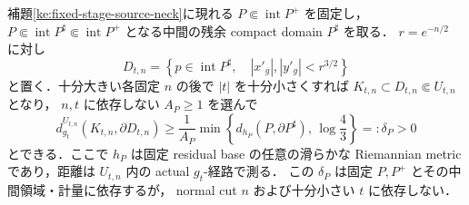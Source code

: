 \begin{lemma}
\label{ke:source-shell-first-exit-buffer}
補題\ref{ke:fixed-stage-source-neck}に現れる
\(P\Subset\operatorname{int}P^+\) を固定し，
\(P\Subset\operatorname{int}P^\sharp\Subset\operatorname{int}P^+\)
となる中間の残余 compact domain \(P^\sharp\) を取る．
\(r=e^{-n/2}\) に対し
\[
 D_{t,n}=
 \left\{p\in\operatorname{int}P^\sharp,\quad
 |x'_g|,|y'_g|<r^{3/2}\right\}
\]
と置く．十分大きい各固定 \(n\) の後で \(|t|\) を十分小さくすれば
\(K_{t,n}\subset D_{t,n}\Subset U_{t,n}\) となり，
\(n,t\) に依存しない \(A_P\ge1\) を選んで
\begin{equation}\label{ke:eq:source-shell-first-exit-buffer}
 d_{g_t}^{U_{t,n}}(K_{t,n},\partial D_{t,n})
 \ge \frac1{A_P}
  \min\left\{
    d_{h_P}(P,\partial P^\sharp),\,
    \log\frac43
  \right\}
 =:\delta_P>0
\end{equation}
とできる．ここで \(h_P\) は固定 residual base の任意の滑らかな
Riemannian metric であり，距離は \(U_{t,n}\) 内の
actual \(g_t\)-経路で測る．
この \(\delta_P\) は固定 \(P,P^+\) とその中間領域・計量に依存するが，
normal cut \(n\) および十分小さい \(t\) に依存しない．
\end{lemma}

